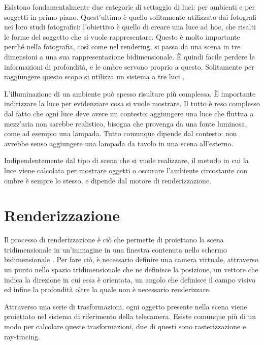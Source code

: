 Esistono fondamentalmente due categorie di settaggio di luci: per ambienti e per soggetti in primo piano.
Quest'ultimo è quello solitamente utilizzato dai fotografi nei loro studi fotografici: l'obiettivo è quello di creare una luce ad hoc, che risalti le forme del soggetto che si vuole rappresentare.
Questo è molto importante perché nella fotografia, così come nel rendering, si passa da una scena in tre dimensioni a una sua rappresentazione bidimensionale. 
È quindi facile perdere le informazioni di profondità, e le ombre servono proprio a questo. Solitamente per raggiungere questo scopo si utilizza un sistema a tre luci \cite{3Plight}.

L'illuminazione di un ambiente può spesso risultare più complessa. È importante indirizzare la luce per evidenziare cosa si vuole mostrare.
Il tutto è reso complesso dal fatto che ogni luce deve avere un contesto: aggiungere una luce che fluttua a mezz'aria non sarebbe realistico, bisogna che provenga da una fonte luminosa, come ad esempio una lampada.
Tutto comunque dipende dal contesto: non avrebbe senso aggiungere una lampada da tavolo in una scena all'esterno.

Indipendentemente dal tipo di scena che si vuole realizzare, il metodo in cui la luce viene calcolata per mostrare oggetti o oscurare l'ambiente circostante con ombre è sempre lo stesso, e dipende dal motore di renderizzazione.

\section{Renderizzazione}

Il processo di renderizzazione è ciò che permette di proiettano la scena tridimensionale in un’immagine in una finestra contenuta nello schermo bidimensionale \cite{renderingPipelineDLazzaro}.
Per fare ciò, è necessario definire una camera virtuale, attraverso un punto nello spazio tridimensionale che ne definisce la posizione, un vettore che indica la direzione in cui essa è orientata, un angolo che definisce il campo visivo ed infine la profondità oltre la quale non è necessario renderizzare.

Attraverso una serie di trasformazioni, ogni oggetto presente nella scena viene proiettato nel sistema di riferimento della telecamera.
Esiste comunque più di un modo per calcolare queste trasformazioni, due di questi sono rasterizzazione e ray-tracing.

